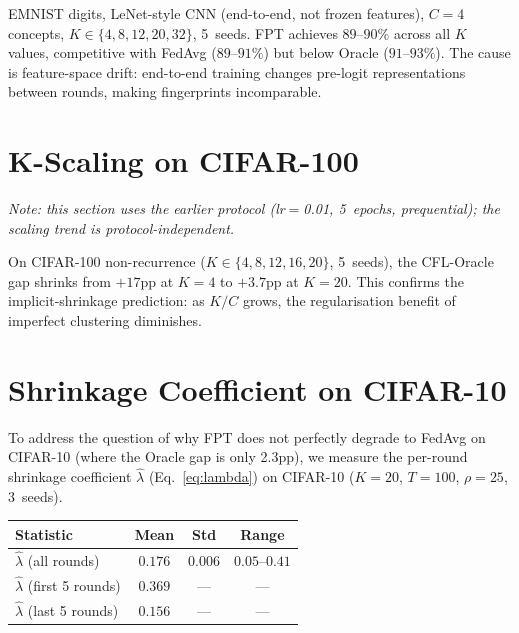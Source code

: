 \documentclass[11pt]{article}
\begin{document}
EMNIST digits, LeNet-style CNN (end-to-end, not frozen features), $C{=}4$ concepts, $K \in \{4, 8, 12, 20, 32\}$, 5~seeds.
FPT achieves $89$--$90\%$ across all $K$ values, competitive with FedAvg ($89$--$91\%$) but below Oracle ($91$--$93\%$).
The cause is feature-space drift: end-to-end training changes pre-logit representations between rounds, making fingerprints incomparable.


\section{K-Scaling on CIFAR-100}
\label{app:kscaling}

\emph{Note: this section uses the earlier protocol (lr$=$0.01, 5~epochs, prequential); the scaling trend is protocol-independent.}

On CIFAR-100 non-recurrence ($K \in \{4,8,12,16,20\}$, 5~seeds), the CFL-Oracle gap shrinks from $+17$pp at $K{=}4$ to $+3.7$pp at $K{=}20$.
This confirms the implicit-shrinkage prediction: as $K/C$ grows, the regularisation benefit of imperfect clustering diminishes.


\section{Shrinkage Coefficient on CIFAR-10}
\label{app:lambda_diagnostic}

To address the question of why FPT does not perfectly degrade to FedAvg on CIFAR-10 (where the Oracle gap is only 2.3pp), we measure the per-round shrinkage coefficient $\hat\lambda$ (Eq.~\ref{eq:lambda}) on CIFAR-10 ($K{=}20$, $T{=}100$, $\rho{=}25$, 3~seeds).

\begin{center}
\small
\begin{tabular}{lccc}
\toprule
Statistic & Mean & Std & Range \\
\midrule
$\hat\lambda$ (all rounds) & $0.176$ & $0.006$ & $0.05$--$0.41$ \\
$\hat\lambda$ (first 5 rounds) & $0.369$ & --- & --- \\
$\hat\lambda$ (last 5 rounds) & $0.156$ & --- & --- \\
\bottomrule
\end{tabular}
\end{center}
\end{document}
